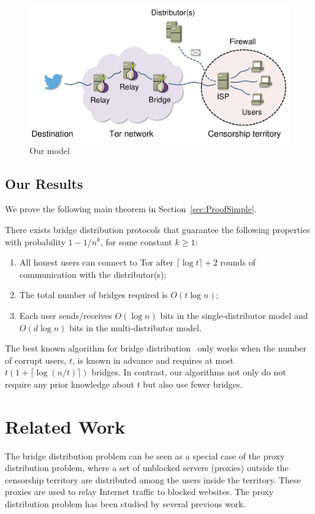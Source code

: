 \begin{figure}[t]
	\centering
	\includegraphics[width=0.62\linewidth]{images/model}
	\caption{Our model}
	\label{fig:model}
\end{figure}

\subsection{Our Results} \label{sec:results}
\noindent We prove the following main theorem in Section~\ref{sec:ProofSimple}.
\begin{theorem}
	\label{thm:main} There exists bridge distribution protocols that guarantee the following properties with probability ${1 - 1/n^k}$, for some constant ${k \geq 1}$: %
	\begin{enumerate}
		\item All honest users can connect to Tor after ${\lceil \log{t} \rceil + 2}$ rounds of communication with the distributor(s);
		\item The total number of bridges required is $O(t\log{n})$;
		\item Each user sends/receives $O(\log{n})$ bits in the single-distributor model and $O(d\log{n})$ bits in the multi-distributor model.
	\end{enumerate}
\end{theorem}

The best known algorithm for bridge distribution~\cite{Mahdian:2010} only works when the number of corrupt users, $t$, is known in advance and requires at most ${t\left(1 + \lceil \log{(n/t)} \rceil \right)}$ bridges. In contrast, our algorithms not only do not require any prior knowledge about $t$ but also use fewer bridges.

\section{Related Work} \label{sec:relatedwork}
The bridge distribution problem can be seen as a special case of the proxy distribution problem, where a set of unblocked servers (proxies) outside the censorship territory are distributed among the users inside the territory. These proxies are used to relay Internet traffic to blocked websites. The proxy distribution problem has been studied by several previous work. 


